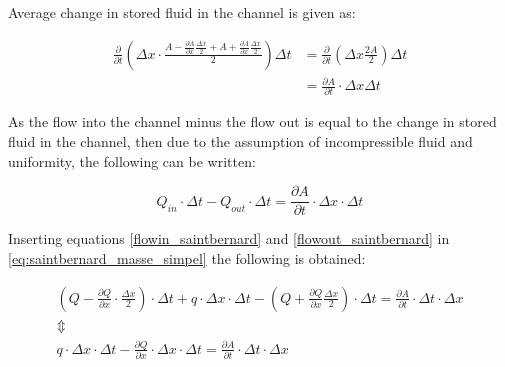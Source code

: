 Average change in stored fluid in the channel is given as:

\begin{equation}\label{stored_saintbernard}
\begin{aligned}
\frac{\partial}{\partial t} \left(\Delta x \cdot \frac{A- \frac{\partial A}{\partial x} \frac{\Delta x}{2} +A + \frac{\partial A}{\partial x} \frac{\Delta x}{2}}{2}  \right) \Delta t 
& = \frac{\partial}{\partial t} \left( \Delta x \frac{2A}{2} \right) \Delta t \\
& = \frac{\partial A}{\partial t} \cdot \Delta x	\Delta t
\end{aligned}
\end{equation}


As the flow into the channel minus the flow out is equal to the change in stored fluid in the channel, then due to the assumption of incompressible fluid and uniformity, the following can be written:  

\begin{equation}\label{eq:saintbernard_masse_simpel}
	Q_{in}\cdot \Delta t - Q_{out}\cdot \Delta t = \frac{\partial A}{\partial t} \cdot \Delta x	\cdot \Delta t
\end{equation}

Inserting equations \ref{flowin_saintbernard} and \ref{flowout_saintbernard} in \ref{eq:saintbernard_masse_simpel} the following is obtained:

\begin{equation}
\begin{array}{l}
	\left(Q - \frac{\partial Q}{\partial x}\cdot \frac{\Delta x}{2}\right) \cdot \Delta t + q \cdot \Delta x \cdot \Delta t - \left(Q + \frac{\partial Q}{ \partial x} \frac{\Delta x}{2} \right) \cdot \Delta t  = \frac{\partial A}{\partial t}\cdot \Delta t 
	\cdot \Delta x \\ 
\Updownarrow \\
q \cdot \Delta x \cdot \Delta t  - \frac{\partial Q}{\partial x} \cdot \Delta x \cdot \Delta t  = \frac{\partial A}{\partial t} \cdot \Delta t 
	\cdot \Delta x 
\end{array}
\label{saintbernard_masse}
\end{equation}

